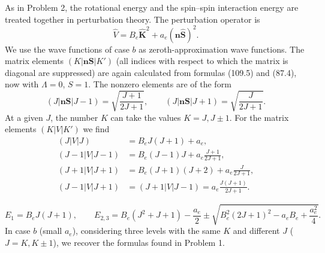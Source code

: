 \SolutionHeading As in Problem 2, the rotational energy and the spin--spin interaction energy are treated together in perturbation theory. The perturbation operator is
\[
 \widehat V=B_e\widehat{\mathbf K}^{2}+a_e(\mathbf n\widehat{\mathbf S})^2.
\]
We use the wave functions of case $b$ as zeroth-approximation wave functions. The matrix elements $(K|\mathbf n\mathbf S|K')$ (all indices with respect to which the matrix is diagonal are suppressed) are again calculated from formulas (109.5) and (87.4), now with $\Lambda=0$, $S=1$. The nonzero elements are of the form
\[
 (J|\mathbf n\mathbf S|J-1)=\sqrt{\frac{J+1}{2J+1}},\qquad
 (J|\mathbf n\mathbf S|J+1)=\sqrt{\frac{J}{2J+1}}.
\]
At a given $J$, the number $K$ can take the values $K=J,J\pm1$. For the matrix elements $(K|V|K')$ we find
\begin{align*}
 (J|V|J)&=B_eJ(J+1)+a_e,\\
 (J-1|V|J-1)&=B_e(J-1)J+a_e\frac{J+1}{2J+1},\\
 (J+1|V|J+1)&=B_e(J+1)(J+2)+a_e\frac{J}{2J+1},\\
 (J-1|V|J+1)&=(J+1|V|J-1)=a_e\frac{J(J+1)}{2J+1}.
\end{align*}

\[
 E_1=B_eJ(J+1),\qquad
 E_{2,3}=B_e(J^2+J+1)-\frac{a_e}{2}
 \pm\sqrt{B_e^2(2J+1)^2-a_eB_e+\frac{a_e^2}{4}}.
\]
In case $b$ (small $a_e$), considering three levels with the same $K$ and different $J$ ($J=K,K\pm1$), we recover the formulas found in Problem 1.
